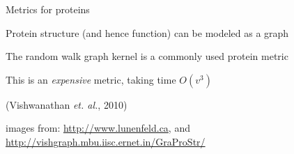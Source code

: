 \begin{frame}[fragile]{Metrics for proteins}

\vspace{-0.3in}
\begin{center}
\end{center}

\vspace{-0.2in}

%
Protein structure (and hence function) can be modeled as a graph

\vspace{0.1in}
The random walk graph kernel is a commonly used protein metric

\vspace{0.1in}
This is an \emph{expensive} metric, taking time $O(v^3)$

\vspace{0.1in}
(Vishwanathan \emph{et. al.}, 2010)

\vspace{0.15in}
{\tiny
images from: \url{http://www.lunenfeld.ca}, and \url{http://vishgraph.mbu.iisc.ernet.in/GraProStr/}
}

\end{frame}


